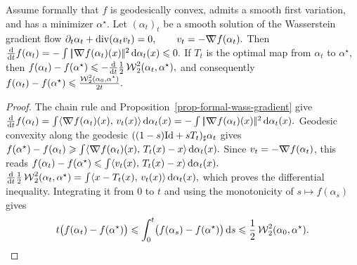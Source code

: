 \begin{prop}\label{prop-convex-wass-flow-rate}
Assume formally that \(f\) is geodesically convex, admits a smooth first variation, and has a minimizer \(\alpha^\star\). Let \((\alpha_t)_t\) be a smooth solution of the Wasserstein gradient flow
\(\partial_t\alpha_t+\operatorname{div}(\alpha_t v_t)=0, \qquad v_t=-\mathord{\nabla\mkern-9.3mu\nabla} f(\alpha_t).\)
Then
\(\frac{\mathrm{d}}{\mathrm{d} t} f(\alpha_t) = -\int |\!| \mathord{\nabla\mkern-9.3mu\nabla} f(\alpha_t)(x) |\!|^2\,\mathrm{d}\alpha_t(x) \leqslant 0.\)
If \(T_t\) is the optimal map from \(\alpha_t\) to \(\alpha^\star\), then
\(f(\alpha_t)-f(\alpha^\star) \leqslant -\frac{\mathrm{d}}{\mathrm{d} t}\frac12 \operatorname{\mathcal{W}}_2^2(\alpha_t,\alpha^\star),\)
and consequently
\(f(\alpha_t)-f(\alpha^\star) \leqslant \frac{\operatorname{\mathcal{W}}_2^2(\alpha_0,\alpha^\star)}{2t}.\)
\end{prop}
\begin{proof}
The chain rule and Proposition~\ref{prop-formal-wass-gradient} give
\(\frac{\mathrm{d}}{\mathrm{d} t}f(\alpha_t) = \int \langle \mathord{\nabla\mkern-9.3mu\nabla} f(\alpha_t)(x),\,v_t(x)\rangle\,\mathrm{d}\alpha_t(x) = -\int |\!| \mathord{\nabla\mkern-9.3mu\nabla} f(\alpha_t)(x) |\!|^2\,\mathrm{d}\alpha_t(x).\)
Geodesic convexity along the geodesic
\(((1-s)\mathrm{Id}+sT_t)_\sharp\alpha_t\) gives
\(f(\alpha^\star)-f(\alpha_t) \geqslant \int \langle \mathord{\nabla\mkern-9.3mu\nabla} f(\alpha_t)(x),\,T_t(x)-x\rangle\,\mathrm{d}\alpha_t(x).\)
Since \(v_t=-\mathord{\nabla\mkern-9.3mu\nabla} f(\alpha_t)\), this reads \(f(\alpha_t)-f(\alpha^\star) \leqslant \int \langle v_t(x),\,T_t(x)-x\rangle\,\mathrm{d}\alpha_t(x).\)
\(\frac{\mathrm{d}}{\mathrm{d} t}\frac12\operatorname{\mathcal{W}}_2^2(\alpha_t,\alpha^\star) = \int \langle x-T_t(x),\,v_t(x)\rangle\,\mathrm{d}\alpha_t(x),\)
which proves the differential inequality. Integrating it from \(0\) to \(t\) and using the monotonicity of \(s\mapsto f(\alpha_s)\) gives
\[
t\bigl(f(\alpha_t)-f(\alpha^\star)\bigr)
\leqslant
\int_0^t \bigl(f(\alpha_s)-f(\alpha^\star)\bigr)\,\mathrm{d} s
\leqslant
\frac12\operatorname{\mathcal{W}}_2^2(\alpha_0,\alpha^\star).
\]
\end{proof}

